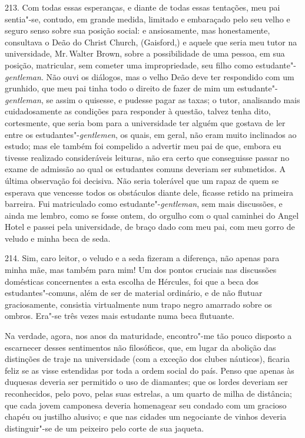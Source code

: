 213. Com todas essas esperanças, e diante de todas essas tentações, meu
pai sentia"-se, contudo, em grande medida, limitado e embaraçado pelo seu
velho e seguro senso sobre sua posição social: e ansiosamente, mas
honestamente, consultava o Deão do Christ Church, (Gaisford,) e aquele
que seria meu tutor na universidade, Mr.\,Walter Brown, sobre a
possibilidade de uma pessoa, em sua posição, matricular, sem cometer uma
impropriedade, seu filho como estudante"-\emph{gentleman}. Não ouvi os
diálogos, mas o velho Deão deve ter respondido com um grunhido, que meu
pai tinha todo o direito de fazer de mim um estudante"-\emph{gentleman},
se assim o quisesse, e pudesse pagar as taxas; o tutor, analisando mais
cuidadosamente as condições para responder à questão, talvez tenha dito,
cortesmente, que seria bom para a universidade ter alguém que gostava de
ler entre os estudantes"-\emph{gentlemen}, os quais, em geral, não eram
muito inclinados ao estudo; mas ele também foi compelido a advertir meu
pai de que, embora eu tivesse realizado consideráveis leituras, não era
certo que conseguisse passar no exame de admissão ao qual os estudantes
comuns deveriam ser submetidos. A última observação foi decisiva. Não
seria tolerável que um rapaz de quem se esperava que vencesse todos os
obstáculos diante dele, ficasse retido na primeira barreira. Fui
matriculado como estudante"-\emph{gentleman}, sem mais discussões, e
ainda me lembro, como se fosse ontem, do orgulho com o qual caminhei do
Angel Hotel e passei pela universidade, de braço dado com meu pai, com
meu gorro de veludo e minha beca de seda.

214. Sim, caro leitor, o veludo e a seda fizeram a diferença, não apenas
para minha mãe, mas também para mim! Um dos pontos cruciais nas
discussões domésticas concernentes a esta escolha de Hércules, foi que a
beca dos estudantes"-comuns, além de ser de material ordinário, e de não
flutuar graciosamente, consistia virtualmente num trapo negro amarrado
sobre os ombros. Era"-se três vezes mais estudante numa beca flutuante.

Na verdade, agora, nos anos da maturidade, encontro"-me tão pouco
disposto a escarnecer desses sentimentos não filosóficos, que, em lugar
da abolição das distinções de traje na universidade (com a exceção dos
clubes náuticos), ficaria feliz se as visse estendidas por toda a ordem
social do país. Penso que apenas às duquesas deveria ser permitido o uso
de diamantes; que os lordes deveriam ser reconhecidos, pelo povo, pelas
suas estrelas, a um quarto de milha de distância; que cada jovem
camponesa deveria homenagear seu condado com um gracioso chapéu ou
justilho alusivo; e que nas cidades um negociante de vinhos deveria
distinguir"-se de um peixeiro pelo corte de sua jaqueta.

